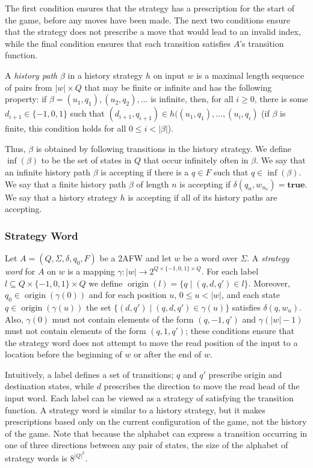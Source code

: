 \documentclass[10pt,a4paper]{amsart}
\theoremstyle{plain}
\theoremstyle{definition}
\theoremstyle{definition}
\DeclareMathOperator{\?}{?}
\DeclareMathOperator{\origin}{origin}
\begin{document}
The first condition ensures that the strategy has a prescription for the start of the game, before any moves have been made.
The next two conditions ensure that the strategy does not prescribe a move that would lead to an invalid index,
while the final condition ensures that each transition satisfies $A$'s transition function.

A \textit{history path} $\beta$ in a history strategy $h$ on input $w$ is a maximal length sequence of pairs from $|w| \times Q$
that may be finite or infinite and has the following property: if $\beta = (u_1,q_1), (u_2,q_2), \ldots$ is infinite, then,
for all $i \geq 0$, there is some $d_{i+1} \in \{-1,0,1 \}$ such that $(d_{i+1},q_{i+1}) \in h((u_1,q_1),\ldots,(u_i,q_i)$
(if $\beta$ is finite, this condition holds for all $0 \leq i < |\beta|$).

Thus, $\beta$ is obtained by following transitions in the history strategy.
We define $\inf(\beta)$ to be the set of states in $Q$ that occur infinitely often in $\beta$.
We say that an infinite history path $\beta$ is accepting if there is a $q \in F$ such that $q \in \inf(\beta)$.
We say that a finite history path $\beta$ of length $n$ is accepting if $\delta(q_n, w_{u_n}) = \textbf{true}$. We say that a history strategy
$h$ is accepting if all of its history paths are accepting.



\subsubsection{Strategy Word}

Let $A = (Q,\Sigma,\delta,q_0,F)$ be a 2AFW and let $w$ be a word over $\Sigma$. A \textit{strategy word} for $A$ on $w$ is a mapping $\gamma : |w| \rightarrow 2^{Q \times \{-1,0,1\} \times Q}$.
For each label $l \subseteq Q \times \{-1,0,1\} \times Q$ we define $\origin(l) = \{ q \mid (q,d,q') \in l \}$. Moreover, $q_0 \in \origin(\gamma(0))$ and for each position $u$, $0 \leq u < |w|$, and each state $q \in \origin(\gamma(u))$ the set $\{ (d,q') \mid (q,d,q') \in \gamma(u) \}$ satisfies $\delta(q, w_u)$. Also, $\gamma(0)$ must not contain elements of the form $(q,-1,q')$ and $\gamma(|w|-1)$ must not contain elements of the form $(q,1,q')$; these conditions ensure that the strategy word does not attempt to move the read position of the input to a location before the beginning of $w$ or after the end of $w$.

Intuitively, a label defines a set of transitions; $q$ and $q'$ prescribe origin and destination states, while $d$ prescribes the direction to move the read head of the input word. Each label can be viewed as a strategy of satisfying the transition function. A strategy word is similar to a history strategy, but it makes prescriptions based only on the current configuration of the game, not the history of the game. Note that because the alphabet can express a transition occurring in one of three directions between any pair of states, the size of the alphabet of strategy words is $8^{|Q|^2}$.
\end{document}
